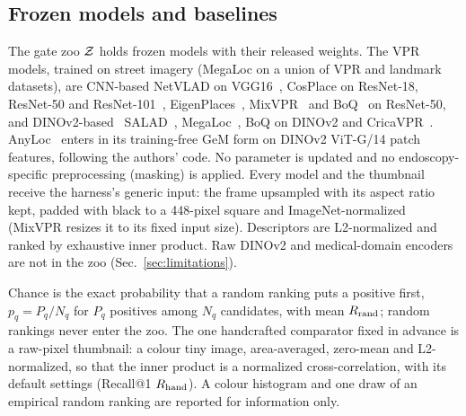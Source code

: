 \subsection{Frozen models and baselines}
\label{sec:zoo}
The gate zoo $\mathcal{Z}$ holds  frozen models with their released
weights. The VPR models, trained on street imagery (MegaLoc on a union of
VPR and landmark datasets), are CNN-based NetVLAD on
VGG16~\cite{arandjelovic2016netvlad}, CosPlace on ResNet-18, ResNet-50 and
ResNet-101~\cite{berton2022rethinking}, EigenPlaces~\cite{berton2023eigenplaces},
MixVPR~\cite{alibey2023mixvpr} and BoQ~\cite{alibey2024boq} on ResNet-50, and
DINOv2-based~\cite{oquab2023dinov2} SALAD~\cite{izquierdo2024optimal},
MegaLoc~\cite{berton2025megaloc}, BoQ on DINOv2 and
CricaVPR~\cite{lu2024cricavpr}. AnyLoc~\cite{keetha2024anyloc} enters in its
training-free GeM form on DINOv2 ViT-G/14 patch features, following the
authors' code. No parameter is updated and no endoscopy-specific
preprocessing (masking) is applied. Every model and the thumbnail receive
the harness's generic input: the frame upsampled with its aspect ratio kept,
padded with black to a 448-pixel square and ImageNet-normalized (MixVPR
resizes it to its fixed input size). Descriptors are L2-normalized and
ranked by exhaustive inner product.
Raw DINOv2 and medical-domain encoders are not in the zoo
(Sec.~\ref{sec:limitations}).

Chance is the exact probability that a random ranking puts a positive
first, $p_q=P_q/N_q$ for $P_q$ positives among $N_q$ candidates, with mean
$R_{\mathrm{rand}}$; random rankings never enter the zoo. The one handcrafted comparator
fixed in advance is a raw-pixel thumbnail: a colour tiny image, area-averaged,
zero-mean and L2-normalized, so that the inner product is a normalized
cross-correlation, with its default settings (Recall@1 $R_{\mathrm{hand}}$). A colour
histogram and one draw of an empirical random ranking are reported for
information only.

